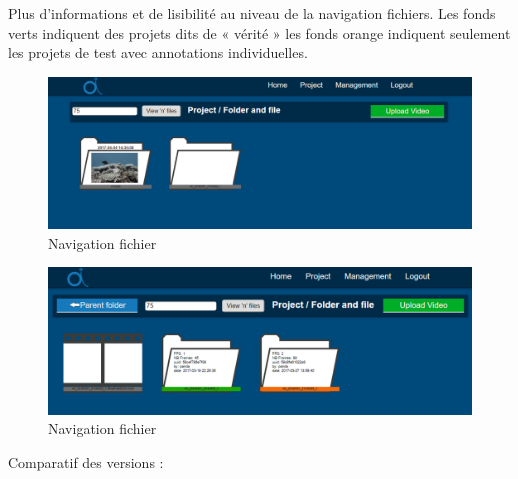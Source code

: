 \documentclass[12pt]{article}
\begin{document}
Plus d’informations et de lisibilité au niveau de la navigation fichiers.
Les fonds verts indiquent des projets dits de « vérité » les fonds orange indiquent seulement les projets de test avec annotations individuelles.

\begin{figure}[H]
\centering
\includegraphics[width=1\textwidth]{img/OIA_V2/oia_v2_02.png}
 \caption{Navigation fichier}
 \label{fig:nav_1}
\end{figure}
\begin{figure}[H]
\centering
\includegraphics[width=1\textwidth]{img/OIA_V2/oia_v2_03.png}
 \caption{Navigation fichier}
 \label{fig:nav_2}
\end{figure}

Comparatif des versions :
\end{document}

